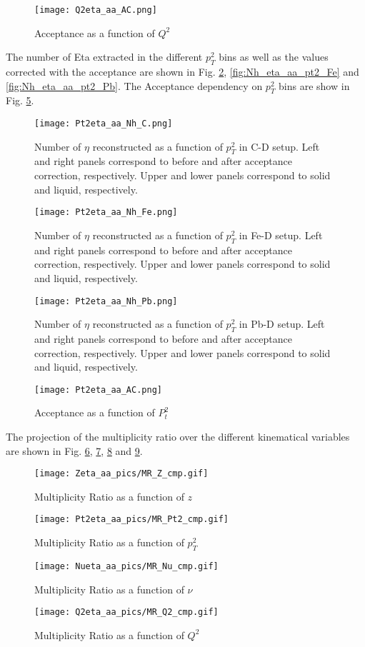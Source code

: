 %
\begin{figure}[H]
\centering
\texttt{[image: Q2eta\_aa\_AC.png]}
\caption{Acceptance as a function of $Q^2$}
\label{fig:AC_eta_aa_q2}
\end{figure}
%
\clearpage
The number of Eta extracted in the different $p_T^2$ bins as well as the values corrected with the acceptance are shown in Fig. \ref{fig:Nh_eta_aa_pt2_C}, \ref{fig:Nh_eta_aa_pt2_Fe} and \ref{fig:Nh_eta_aa_pt2_Pb}. The Acceptance dependency on $p_T^2$ bins are show in Fig. \ref{fig:AC_eta_aa_pt2}.
\begin{figure}[H]
\centering
\texttt{[image: Pt2eta\_aa\_Nh\_C.png]}
\caption{Number of $\eta$ reconstructed as a function of $p_T^2$ in C-D setup. Left and right panels correspond to before and after acceptance correction, respectively. Upper and lower panels correspond to solid and liquid, respectively.}
\label{fig:Nh_eta_aa_pt2_C}
\end{figure}
%
\begin{figure}[H]
\centering
\texttt{[image: Pt2eta\_aa\_Nh\_Fe.png]}
\caption{Number of $\eta$ reconstructed as a function of $p_T^2$ in Fe-D setup. Left and right panels correspond to before and after acceptance correction, respectively. Upper and lower panels correspond to solid and liquid, respectively.}
\label{fig::Nh_eta_aa_pt2_Fe}
\end{figure}
%
\begin{figure}[H]
\centering
\texttt{[image: Pt2eta\_aa\_Nh\_Pb.png]}
\caption{Number of $\eta$ reconstructed as a function of $p_T^2$ in Pb-D setup. Left and right panels correspond to before and after acceptance correction, respectively. Upper and lower panels correspond to solid and liquid, respectively.}
\label{fig::Nh_eta_aa_pt2_Pb}
\end{figure}
%
\begin{figure}[H]
\centering
\texttt{[image: Pt2eta\_aa\_AC.png]}
\caption{Acceptance as a function of $P_t^{2}$}
\label{fig:AC_eta_aa_pt2}
\end{figure}
%
The projection of the multiplicity ratio over the different kinematical variables are shown in Fig. \ref{fig:MR_eta_aa_z}, \ref{fig:MR_eta_aa_pt2}, \ref{fig:MR_eta_aa_nu} and \ref{fig:MR_eta_aa_q2}.
\begin{figure}[H]
\centering
\texttt{[image: Zeta\_aa\_pics/MR\_Z\_cmp.gif]}
\caption{Multiplicity Ratio as a function of $z$}
\label{fig:MR_eta_aa_z}
\end{figure}
%
\begin{figure}[H]
\centering
\texttt{[image: Pt2eta\_aa\_pics/MR\_Pt2\_cmp.gif]}
\caption{Multiplicity Ratio as a function of $p_T^2$}
\label{fig:MR_eta_aa_pt2}
\end{figure}
%
\begin{figure}[H]
\centering
\texttt{[image: Nueta\_aa\_pics/MR\_Nu\_cmp.gif]}
\caption{Multiplicity Ratio as a function of $\nu$}
\label{fig:MR_eta_aa_nu}
\end{figure}
%
\begin{figure}[H]
\centering
\texttt{[image: Q2eta\_aa\_pics/MR\_Q2\_cmp.gif]}
\caption{Multiplicity Ratio as a function of $Q^2$}
\label{fig:MR_eta_aa_q2}
\end{figure}

